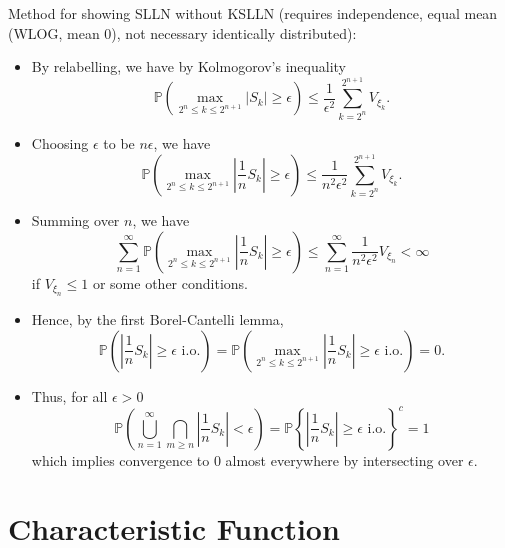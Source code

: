 \documentclass[]{article}
\theoremstyle{definition}
\begin{document}
Method for showing SLLN without KSLLN (requires independence, equal mean (WLOG, mean 0), 
not necessary identically distributed):
\begin{itemize}
  \item By relabelling, we have by Kolmogorov's inequality 
  \[\mathbb{P}\left(\max_{2^n \le k \le 2^{n + 1}} |S_k| \ge \epsilon\right) \le 
    \frac{1}{\epsilon^2} \sum_{k = 2^n}^{2^{n + 1}} V_{\xi_k}.\]
  \item Choosing \(\epsilon\) to be \(n\epsilon\), we have 
  \[\mathbb{P}\left(\max_{2^n \le k \le 2^{n + 1}} \left|\frac{1}{n}S_k\right| \ge \epsilon\right) \le 
    \frac{1}{n^2\epsilon^2} \sum_{k = 2^n}^{2^{n + 1}} V_{\xi_k}.\]
  \item Summing over \(n\), we have 
  \[\sum_{n = 1}^\infty \mathbb{P}\left(\max_{2^n \le k \le 2^{n + 1}} \left|\frac{1}{n}S_k\right| \ge \epsilon\right) \le 
    \sum_{n = 1}^\infty \frac{1}{n^2\epsilon^2} V_{\xi_n} < \infty\]
  if \(V_{\xi_n} \le 1\) or some other conditions.
  \item Hence, by the first Borel-Cantelli lemma, 
  \[\mathbb{P}\left(\left|\frac{1}{n}S_k\right| \ge \epsilon \text{ i.o.}\right) = 
    \mathbb{P}\left(\max_{2^n \le k \le 2^{n + 1}} \left|\frac{1}{n}S_k\right| \ge \epsilon \text{ i.o.}\right) = 0.\]
  \item Thus, for all \(\epsilon > 0\)
  \[\mathbb{P}\left(\bigcup_{n = 1}^\infty \bigcap_{m \ge n} \left|\frac{1}{n} S_k\right| < \epsilon\right)
    = \mathbb{P}\left\{\left|\frac{1}{n}S_k\right| \ge \epsilon \text{ i.o.}\right\}^c = 1\]
  which implies convergence to 0 almost everywhere by intersecting over \(\epsilon\).
\end{itemize}

\section*{Characteristic Function}
\end{document}
